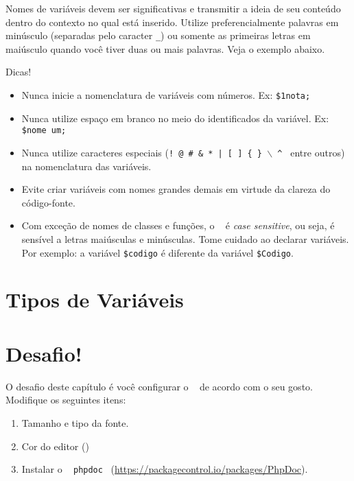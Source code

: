 Nomes de variáveis devem ser significativas e transmitir a ideia de seu conteúdo 
dentro do contexto no qual está inserido.
Utilize preferencialmente palavras em minúsculo (separadas pelo caracter \texttt{\_}) ou 
somente as primeiras letras em maiúsculo quando você tiver duas ou mais palavras. 
Veja o exemplo abaixo. 



Dicas! \newline
\begin{itemize}
    \item Nunca inicie a nomenclatura de variáveis com números. Ex: \texttt{\$1nota;}
    \item Nunca utilize espaço em branco no meio do identificados da variável. Ex: \texttt{\$nome um;}
    \item Nunca utilize caracteres especiais (\texttt{! @ \# \& * | [ ] \{ \} $\backslash$ \^ } 
    entre outros) na nomenclatura das variáveis.
    \item Evite criar variáveis com nomes grandes demais em virtude da clareza do código-fonte.
    \item Com exceção de nomes de classes e funções, o \php~ é \textit{case sensitive}, ou seja, 
    é sensível a letras maiúsculas e minúsculas. Tome cuidado ao declarar variáveis. Por exemplo: 
    a variável \texttt{\$codigo} é diferente da variável \texttt{\$Codigo}.
\end{itemize}


\section{Tipos de Variáveis}
\label{tipos-de-variaveis}


\section{Desafio!}
\label{cap3-desafio}
O desafio deste capítulo é você configurar o \sublime~ de acordo com o seu gosto.
Modifique os seguintes itens:
\begin{enumerate}
  \item Tamanho e tipo da fonte.
  \item Cor do editor ()
  \item Instalar o \plugin~ \texttt{phpdoc}~ (\url{https://packagecontrol.io/packages/PhpDoc}).
\end{enumerate}
